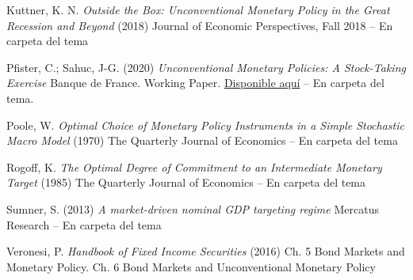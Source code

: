 \documentclass{nuevotema}
\begin{document}
Kuttner, K. N. \textit{Outside the Box: Unconventional Monetary Policy in the Great Recession and Beyond} (2018) Journal of Economic Perspectives, Fall 2018 -- En carpeta del tema

Pfister, C.; Sahuc, J-G. (2020) \textit{ Unconventional Monetary Policies: A Stock-Taking Exercise} Banque de France. Working Paper. \href{https://publications.banque-france.fr/sites/default/files/medias/documents/wp761.pdf}{Disponible aquí} -- En carpeta del tema.

Poole, W. \textit{Optimal Choice of Monetary Policy Instruments in a Simple Stochastic Macro Model} (1970) The Quarterly Journal of Economics -- En carpeta del tema

Rogoff, K. \textit{The Optimal Degree of Commitment to an Intermediate Monetary Target} (1985) The Quarterly Journal of Economics -- En carpeta del tema

Sumner, S. (2013) \textit{A market-driven nominal GDP targeting regime} Mercatus Research --  En carpeta del tema

Veronesi, P. \textit{Handbook of Fixed Income Securities} (2016) Ch. 5 Bond Markets and Monetary Policy. Ch. 6 Bond Markets and Unconventional Monetary Policy
\end{document}
